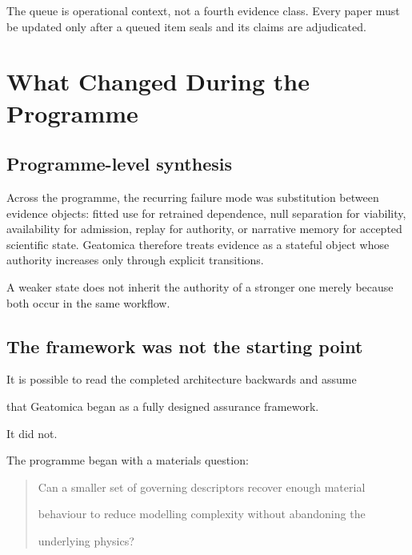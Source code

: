 \documentclass[11pt,a4paper,oneside]{report}
\begin{document}
The queue is operational context, not a fourth evidence class. Every paper must
be updated only after a queued item seals and its claims are adjudicated.


\chapter{What Changed During the Programme}



\label{chap:programme-evolution}

\section{Programme-level synthesis}

Across the programme, the recurring failure mode was substitution between
evidence objects: fitted use for retrained dependence, null separation for
viability, availability for admission, replay for authority, or narrative
memory for accepted scientific state. Geatomica therefore treats evidence
as a stateful object whose authority increases only through explicit
transitions.

\begin{governingrule}
A weaker state does not inherit the authority of a stronger one merely
because both occur in the same workflow.
\end{governingrule}





\section{The framework was not the starting point}



It is possible to read the completed architecture backwards and assume

that Geatomica began as a fully designed assurance framework.



It did not.



The programme began with a materials question:



\begin{quote}



Can a smaller set of governing descriptors recover enough material

behaviour to reduce modelling complexity without abandoning the

underlying physics?



\end{quote}
\end{document}
